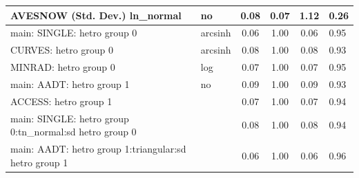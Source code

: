 \begin{table}
\begin{center}
\begin{tabular}{|l|l|c|c|c|l|}
			\hline
			AVESNOW (Std. Dev.) ln_normal & no & 0.08 & 0.07 & 1.12 & 0.26 \\
			\hline
			main: SINGLE: hetro group 0 & arcsinh & 0.06 & 1.00 & 0.06 & 0.95 \\
			\hline
			CURVES: hetro group 0 & arcsinh & 0.08 & 1.00 & 0.08 & 0.93 \\
			\hline
			MINRAD: hetro group 0 & log & 0.07 & 1.00 & 0.07 & 0.95 \\
			\hline
			main: AADT: hetro group 1 & no & 0.09 & 1.00 & 0.09 & 0.93 \\
			\hline
			ACCESS: hetro group 1 &  & 0.07 & 1.00 & 0.07 & 0.94 \\
			\hline
			main: SINGLE: hetro group 0:tn_normal:sd  hetro group 0 &  & 0.08 & 1.00 & 0.08 & 0.94 \\
			\hline
			main: AADT: hetro group 1:triangular:sd  hetro group 1 &  & 0.06 & 1.00 & 0.06 & 0.96 \\
			\hline
		\end{tabular}
	\end{center}
\end{table}